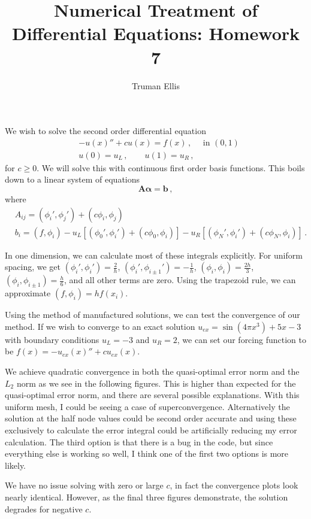 \documentclass[10pt,letterpaper]{article}
\title{Numerical Treatment of Differential Equations: Homework 7}
\author{Truman Ellis}
\begin{document}
\maketitle

We wish to solve the second order differential equation
\begin{align*}
&-u(x)''+cu(x)=f(x)\,,\quad \text{ in } (0,1)\\
&u(0)=u_L\,,\quad\quad u(1)=u_R\,,
\end{align*}
for $c\ge0$. We will solve this with continuous first order basis functions.
This boils down to a linear system of equations
\[
\mathbf{A}\boldsymbol\alpha=\mathbf{b}\,,
\]
where 
\begin{align*}
&A_{ij}=(\phi_i',\phi_j')+(c\phi_i,\phi_j)\\
&b_i=(f,\phi_i)-u_L[(\phi_0',\phi_i')+(c\phi_0,\phi_i)]-u_R[(\phi_N',\phi_i')+(c\phi_N,\phi_i)]\,.
\end{align*}

In one dimension, we can calculate most of these integrals explicitly. For
uniform spacing, we get $(\phi_i',\phi_i')=\frac{2}{h}$,
$(\phi_i',\phi_{i\pm1}')=-\frac{1}{h}$, $(\phi_i,\phi_i)=\frac{2h}{3}$,
$(\phi_i,\phi_{i\pm1})=\frac{h}{6}$, and all other terms are zero.
Using the trapezoid rule, we can approximate $(f,\phi_i)=hf(x_i)$.

Using the method of manufactured solutions, we can test the convergence of our
method. If we wish to converge to an exact solution $u_{ex}=\sin(4\pi x^3)+5x-3$
with boundary conditions $u_L=-3$ and $u_R=2$, we can set our forcing function
to be $f(x)=-u_{ex}(x)''+cu_{ex}(x)$.

We achieve quadratic convergence in both the quasi-optimal error norm and the
$L_2$ norm as we see in the following figures. This is higher than expected for
the quasi-optimal error norm, and there are several possible explanations. With
this uniform mesh, I could be seeing a case of superconvergence. Alternatively
the solution at the half node values could be second order accurate and using
these exclusively to calculate the error integral could be artificially reducing
my error calculation. The third option is that there is a bug in the code, but
since everything else is working so well, I think one of the first two options
is more likely.

We have no issue solving with
zero or large $c$, in fact the convergence plots look nearly identical. However,
as the final three figures demonstrate, the solution degrades for negative $c$.
\end{document}
